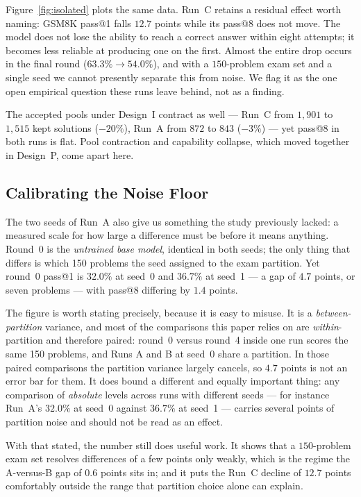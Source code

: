 \documentclass[runningheads]{llncs}
\begin{document}
Figure~\ref{fig:isolated} plots the same data. Run~C retains a residual
effect worth naming: GSM8K pass@1 falls $12.7$
points while its pass@8 does not move. The model does not lose the ability
to reach a correct answer within eight attempts; it becomes less reliable
at producing one on the first. Almost the entire drop occurs in the final
round ($63.3\%\to54.0\%$), and with a $150$-problem exam set and a single
seed we cannot presently separate this from noise. We flag it as the one
open empirical question these runs leave behind, not as a finding.

The accepted pools under Design~I contract as well --- Run~C from $1{,}901$
to $1{,}515$ kept solutions ($-20\%$), Run~A from $872$ to $843$
($-3\%$) --- yet pass@8 in both runs is flat. Pool contraction and
capability collapse, which moved together in Design~P, come apart here.

\subsection{Calibrating the Noise Floor}
\label{sec:seedvar}

The two seeds of Run~A also give us something the study previously lacked:
a measured scale for how large a difference must be before it means
anything. Round~0 is the \emph{untrained base model}, identical in both
seeds; the only thing that differs is which 150 problems the seed assigned
to the exam partition. Yet round~0 pass@1 is $32.0\%$ at seed~0 and
$36.7\%$ at seed~1 --- a gap of $4.7$ points, or seven problems --- with
pass@8 differing by $1.4$ points.

The figure is worth stating precisely, because it is easy to misuse. It is
a \emph{between-partition} variance, and most of the comparisons this paper
relies on are \emph{within}-partition and therefore paired: round~0 versus
round~4 inside one run scores the same 150 problems, and Runs A and B at
seed~0 share a partition. In those paired comparisons the partition
variance largely cancels, so $4.7$ points is not an error bar for them. It
does bound a different and equally important thing: any comparison of
\emph{absolute} levels across runs with different seeds --- for instance
Run~A's $32.0\%$ at seed~0 against $36.7\%$ at seed~1 --- carries several
points of partition noise and should not be read as an effect.

With that stated, the number still does useful work. It shows that a
$150$-problem exam set resolves differences of a few points only weakly,
which is the regime the A-versus-B gap of $0.6$ points sits in; and it puts
the Run~C decline of $12.7$ points comfortably outside the range that
partition choice alone can explain.
\end{document}
